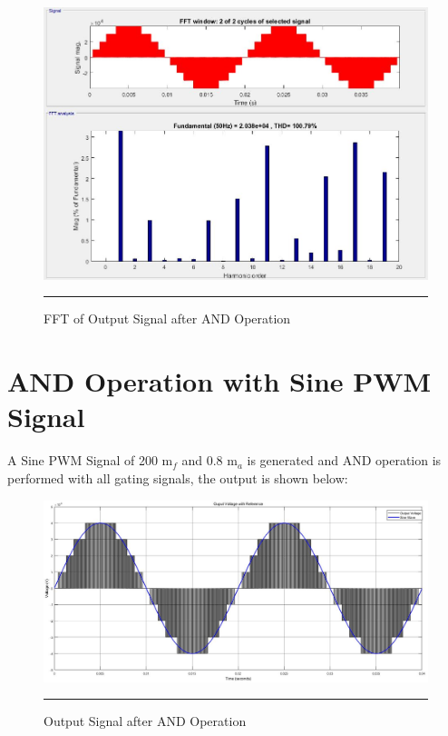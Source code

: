 \begin{figure}[htbp]
	\centering
	\includegraphics[width = 6in]{./Figures/Photos/Simulink/And_PWM_Out_FFT.jpg}
	\rule{35em}{1pt}
	\caption{FFT of Output Signal after AND Operation}
\end{figure}

\section{AND Operation with Sine PWM Signal}
A Sine PWM Signal of 200 m$_f$ and 0.8 m$_a$ is generated and AND operation is performed with all gating signals, the output is shown below:
\begin{figure}[htbp]
	\centering
	\includegraphics[width = 6in]{./Figures/Photos/Simulink/And_SPWM_Out.jpg}
	\rule{35em}{1pt}
	\caption{Output Signal after AND Operation}
\end{figure}

